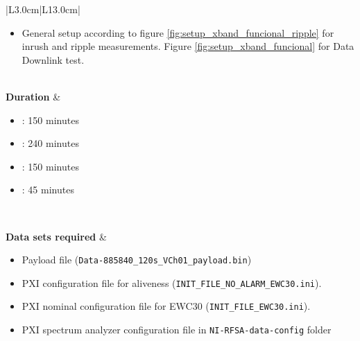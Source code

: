 \begin{table}[H]
\begin{tabular}{|L{3.0cm}|L{13.0cm}|}
\begin{minipage}[t]{\linewidth}
\begin{itemize}[nosep,after=\strut]
		\item General setup according to figure \ref{fig:setup_xband_funcional_ripple} for inrush and ripple measurements. Figure \ref{fig:setup_xband_funcional} for Data Downlink test.
		\end{itemize}
	\end{minipage}	
		\\ 
		\hline
		\textbf{Duration} & \begin{minipage}[t]{\linewidth}
	\begin{itemize}[nosep,after=\strut]
		\item {}: 150 minutes
		\item {}: 240 minutes

		\item {}: 150 minutes		
		\item {}: 45 minutes 
		\end{itemize}
	\end{minipage}
	\\ \hline
	
	\textbf{Data sets required} &  \begin{minipage}[t]{\linewidth}
		\begin{itemize}[nosep,after=\strut]
			\item Payload file (\texttt{Data-885840\_120s\_VCh01\_payload.bin})
			\item \comEgse\xspace PXI configuration file for aliveness (\texttt{INIT\_FILE\_NO\_ALARM\_EWC30.ini}).
			\item \comEgse\xspace PXI nominal configuration file for EWC30 (\texttt{INIT\_FILE\_EWC30.ini}).
			\item PXI spectrum analyzer configuration file in \texttt{NI-RFSA-data-config} folder
				\end{itemize}
			\end{minipage}\\
		\hline
		

\end{tabular}
\end{table}
